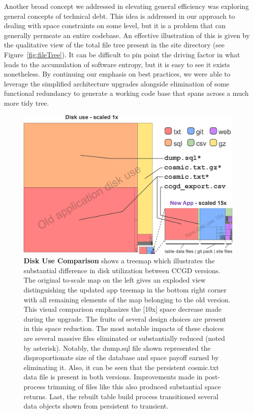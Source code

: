 \documentclass[10pt]{report}
\begin{document}
Another broad concept we addressed in elevating general efficiency was exploring general concepts of technical debt. This idea is addressed in our approach to dealing with space constraints on some level, but it is a problem that can generally permeate an entire codebase. An effective illustration of this is given by the qualitative view of the total file tree present in the site directory (see Figure~\ref{fig:fileTree}). It can be difficult to pin point the driving factor in what leads to the accumulation of software entropy, but it is easy to see it exists nonetheless. By continuing our emphasis on best practices, we were able to leverage the simplified architecture upgrades alongside elimination of some functional redundancy to generate a working code base that spans across a much more tidy tree.

\begin{figure}[H]
    \centering
    \includegraphics[width=\textwidth]{fig/space_tree.pdf}
\caption[Disk Use Comparison]{\textbf{Disk Use Comparison} shows a treemap which illustrates the substantial difference in disk utilization between CCGD versions. The original to-scale map on the left gives an exploded view distinguishing the updated app treemap in the bottom right corner with all remaining elements of the map belonging to the old version. This visual comparison emphasizes the [10x] space decrease made during the upgrade. The fruits of several design choices are present in this space reduction. The most notable impacts of these choices are several massive files eliminated or substantially reduced (noted by asterisk). Notably, the dump.sql file shown represented the disproportionate size of the database and space payoff earned by eliminating it. Also, it can be seen that the persistent cosmic.txt data file is present in both versions. Improvements made in post-process trimming of files like this also produced substantial space returns. Last, the rebuilt table build process transitioned several data objects shown from persistent to transient.}\label{fig:spaceTree}
\end{figure}
\end{document}
